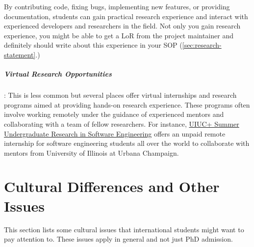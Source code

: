 \documentclass[oneside,11pt,dvipsnames]{book}
\begin{document}
By contributing code, fixing bugs, implementing new features, or providing documentation, students can gain practical research experience and interact with experienced developers and researchers in the field. Not only you gain research experience, you might be able to get a LoR from the project maintainer and definitely should write about this experience in your SOP (\autoref{sec:research-statement}.)

\paragraph{Virtual Research Opportunities}: This is less common but several places offer virtual internships and research programs aimed at providing hands-on research experience. These programs often involve working remotely under the guidance of experienced mentors and collaborating with a team of fellow researchers. For instance, \href{https://docs.google.com/forms/d/1btIwt4HwjyKMOUk-EMy3rbkfWzFxv2lNrMm_zkd0pA4/viewform?edit_requested=true}{UIUC+ Summer Undergraduate Research in Software Engineering}  offers an unpaid remote internship for software engineering students all over the world to collaborate with mentors from University of Illinois at Urbana Champaign.



\chapter{Cultural Differences and Other Issues}\label{sec:cultural}

This section lists some cultural issues that international students might want to pay attention to. These issues apply in general and not just PhD admission.
\end{document}
